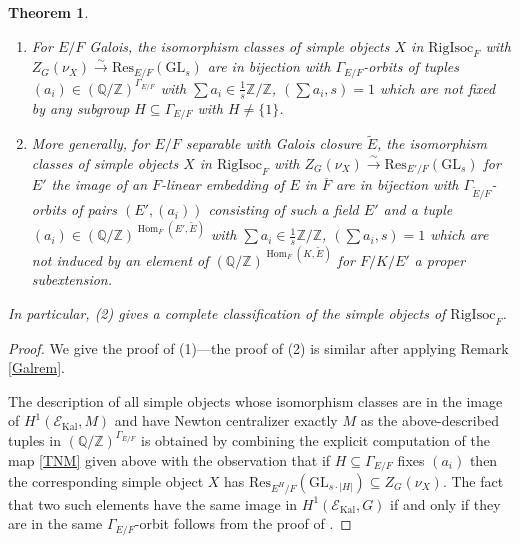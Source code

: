 \documentclass[11pt]{amsart}
\newtheorem{thm}{Theorem}[section]
\theoremstyle{definition}
\newcommand{\mc}{\mathcal}
\newcommand{\Z}{\mathbb{Z}}
\newcommand{\Q}{\mathbb{Q}}
\newcommand{\ov}{\overline}
\newcommand{\Res}{\mathrm{Res}}
\newcommand{\RigIsoc}{\mathrm{RigIsoc}}
\newcommand{\GL}{\mathrm{GL}}
\DeclareMathOperator{\Kal}{Kal}
\DeclareMathOperator{\Hom}{Hom}
\begin{document}
    \begin{thm} \begin{enumerate} 
    \item{For $E/F$ Galois, the isomorphism classes of simple objects $X$ in $\RigIsoc_{F}$ with $Z_{G}(\nu_{X}) \xrightarrow{\sim} \Res_{E/F}(\GL_{s})$ are in bijection with $\Gamma_{E/F}$-orbits of tuples $(a_{i}) \in (\Q/\Z)^{\Gamma_{E/F}}$ with $\sum a_{i} \in \frac{1}{s}\Z/\Z$, $(\sum a_{i},s) =1$ which are not fixed by any subgroup $H \subseteq \Gamma_{E/F}$ with $H \neq \{1\}$.}
    \item{More generally, for $E/F$ separable with Galois closure $\widetilde{E}$, the isomorphism classes of simple objects $X$ in $\RigIsoc_{F}$ with $Z_{G}(\nu_{X}) \xrightarrow{\sim} \Res_{E'/F}(\GL_{s})$ for $E'$ the image of an $F$-linear embedding of $E$ in $\ov{F}$ are in bijection with $\Gamma_{\widetilde{E}/F}$-orbits of pairs $(E', (a_{i}))$ consisting of such a field $E'$ and a tuple $(a_{i}) \in (\Q/\Z)^{\Hom_{F}(E',\widetilde{E})}$ with $\sum a_{i} \in \frac{ 1}{s }\Z/\Z$, $(\sum a_{i},s) = 1$ which are not induced by an element of $(\Q/\Z)^{\Hom_{F}(K,\widetilde{E})}$ for $F/K/E'$ a proper subextension.}
    \end{enumerate}
    In particular, (2) gives a complete classification of the simple objects of $\RigIsoc_{F}$.
    \end{thm}
\begin{proof} We give the proof of (1)---the proof of (2) is similar after applying Remark \ref{Galrem}.

The description of all simple objects whose isomorphism classes are in the image of $H^{1}(\mc{E}_{\Kal}, M)$ and have Newton centralizer exactly $M$ as the above-described tuples in $(\Q/\Z)^{\Gamma_{E/F}}$ is obtained by combining the explicit computation of the map \eqref{TNM} given above with the observation that if $H \subseteq \Gamma_{E/F}$ fixes $(a_{i})$ then the corresponding simple object $X$ has $\Res_{E^{H}/F}(\GL_{s \cdot |H|}) \subseteq Z_{G}(\nu_{X})$. The fact that two such elements have the same image in $H^{1}(\mc{E}_{\Kal}, G)$ if and only if they are in the same $\Gamma_{E/F}$-orbit follows from the proof of \cite[Proposition 3.9]{DS24}.
\end{proof}


\printbibliography
\end{document}
